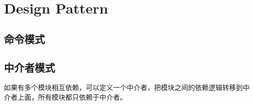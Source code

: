\chapter{Design Pattern}


\section{命令模式}



\section{中介者模式}

如果有多个模块相互依赖，可以定义一个中介者，把模块之间的依赖逻辑转移到中介者上面，所有模块都只依赖于中介者。

